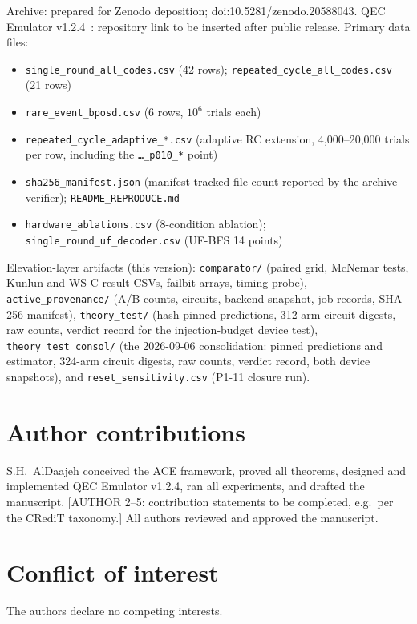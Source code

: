 \documentclass[11pt,a4paper]{article}
\begin{document}
Archive: prepared for Zenodo deposition; doi:10.5281/zenodo.20588043.
QEC Emulator v1.2.4~\cite{AlDaajeh2026emulator}: repository link
to be inserted after public release.
Primary data files:
\begin{itemize}[leftmargin=1.4em,itemsep=0pt,topsep=2pt]
  \item \texttt{single\_round\_all\_codes.csv} (42 rows);
        \texttt{repeated\_cycle\_all\_codes.csv} (21 rows)
  \item \texttt{rare\_event\_bposd.csv} (6 rows, $10^{6}$ trials each)
  \item \texttt{repeated\_cycle\_adaptive\_*.csv} (adaptive RC extension,
        4{,}000--20{,}000 trials per row, including the
        \texttt{\dots\_p010\_*} point)
  \item \texttt{sha256\_manifest.json} (manifest-tracked file count
        reported by the archive verifier); \texttt{README\_REPRODUCE.md}
  \item \texttt{hardware\_ablations.csv} (8-condition ablation);
        \texttt{single\_round\_uf\_decoder.csv} (UF-BFS 14 points)
\end{itemize}
Elevation-layer artifacts (this version):
\texttt{comparator/} (paired grid, McNemar tests, Kunlun and WS-C
result CSVs, failbit arrays, timing probe),
\texttt{active\_provenance/} (A/B counts, circuits, backend snapshot,
job records, SHA-256 manifest),
\texttt{theory\_test/} (hash-pinned predictions, 312-arm circuit
digests, raw counts, verdict record for the injection-budget device
test), \texttt{theory\_test\_consol/} (the 2026-09-06 consolidation:
pinned predictions and estimator, 324-arm circuit digests, raw counts,
verdict record, both device snapshots), and
\texttt{reset\_sensitivity.csv} (P1-11 closure run).

\section*{Author contributions}
S.H.\ AlDaajeh conceived the ACE framework, proved all theorems, designed
and implemented QEC Emulator v1.2.4, ran all experiments, and drafted the
manuscript. [AUTHOR 2--5: contribution statements to be completed, e.g.\
per the CRediT taxonomy.] All authors reviewed and approved the
manuscript.

\section*{Conflict of interest} The authors declare no competing interests.
\end{document}
